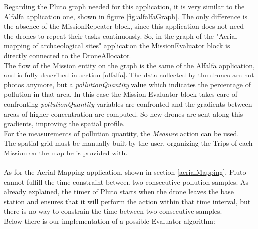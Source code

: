 Regarding the Pluto graph needed for this application, it is very similar to the Alfalfa\cite{alfalfa} application one, shown in figure \ref{fig:alfalfaGraph}.
The only difference is the absence of the MissionRepeater block, since this application does not need the drones to repeat their tasks continuously.
So, in the graph of the "Aerial mapping of archaeological sites" application the MissionEvaluator block is directly connected to the DroneAllocator.
\\

The flow of the Mission entity on the graph is the same of the Alfalfa\cite{alfalfa} application, and is fully described in section \ref{alfalfa}.
The data collected by the drones are not photos anymore, but a \textit{pollutionQuantity} value which indicates the percentage of pollution in that area.
In this case the Mission Evaluator block takes care of confronting \textit{pollutionQuantity} variables are confronted and the gradients between areas of higher concentration are computed.
So new drones are sent along this gradients, improving the spatial profile.
\\

For the measurements of pollution quantity, the \textit{Measure} action can be used.
\\

The spatial grid must be manually built by the user, organizing the Trips of each Mission on the map he is provided with.
\\




\\

As for the Aerial Mapping application, shown in section \ref{aerialMapping}, Pluto cannot fulfill the time constraint between two consecutive pollution samples.
As already explained, the timer of Pluto starts when the drone leaves the base station and ensures that it will perform the action within that time interval, but there is no way to constrain the time between two consecutive samples.
\\


Below there is our implementation of a possible Evaluator algorithm:
\\

